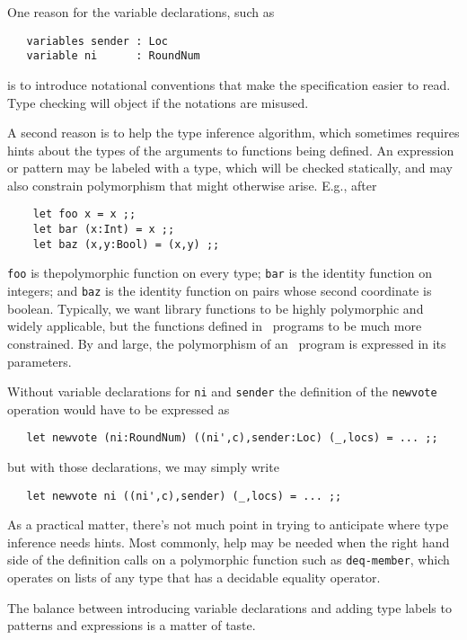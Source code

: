 \documentclass[final]{article}
\begin{document}

One reason for the variable declarations, such as
\begin{emlcode}
\begin{lstlisting}
   variables sender : Loc
   variable ni      : RoundNum
\end{lstlisting}
\end{emlcode}
is to introduce notational conventions that make the specification
easier to read.  Type checking will object if the notations are misused.

A second reason is to help the type inference algorithm, which
sometimes requires hints about the types of the arguments to functions
being defined.  An expression or pattern may be labeled with a type,
which will be checked statically, and may also constrain polymorphism
that might otherwise arise.  E.g., after
\begin{lstlisting}
    let foo x = x ;;
    let bar (x:Int) = x ;;
    let baz (x,y:Bool) = (x,y) ;;
\end{lstlisting}
\lstinline{foo} is thepolymorphic function on every type;
\lstinline{bar} is the identity function on integers; and
\lstinline{baz} is the identity function on pairs whose second
coordinate is boolean.  Typically, we want library functions to be
highly polymorphic and widely applicable, but the functions defined in
\eml\ programs to be much more constrained.  By and large, the
polymorphism of an \eml\ program is expressed in its parameters.

Without variable declarations for \lstinline{ni} and
\lstinline{sender} the definition of the \lstinline{newvote} operation
would have to be expressed as
\begin{lstlisting}
   let newvote (ni:RoundNum) ((ni',c),sender:Loc) (_,locs) = ... ;;
\end{lstlisting}
but with those declarations, we may simply write
\begin{lstlisting}
   let newvote ni ((ni',c),sender) (_,locs) = ... ;;
\end{lstlisting}
As a practical matter, there's not much point in trying to anticipate
where type inference needs hints.  Most commonly, help may be needed when
the right hand side of the definition calls on a polymorphic function
such as \lstinline{deq-member}, which operates on lists of any type
that has a decidable equality operator.

The balance between introducing variable declarations and adding type
labels to patterns and expressions is a matter of taste.
\end{document}
